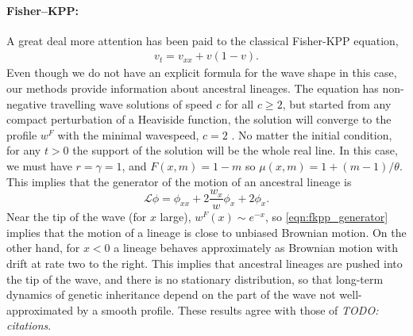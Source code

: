 \documentclass[12pt]{article}
\newcommand{\Lgen}{\mathcal{L}}    %
\newcommand{\comment}[1]{{\color{blue} \it #1}}
\begin{document}
\paragraph{Fisher--KPP:}
A great deal more attention has been paid to the classical Fisher-KPP equation,
\begin{align} \label{eqn:fkpp}
    v_t = v_{xx} + v (1-v) .
\end{align}
Even though we do not have an explicit formula for the wave shape in this case,
our methods provide information about ancestral lineages.
The equation has non-negative travelling wave solutions of speed $c$ for all $c \geq 2$, 
but started from any compact perturbation of a Heaviside function, the 
solution will converge to the profile $w^F$ with the minimal wavespeed, $c=2$
\citep{kolmogorov/petrovsky/piscounov:1937,bramson:1983}.
No matter the initial condition,
for any $t>0$ the support of the 
solution will be the whole real line. 
In this case, we must have $r = \gamma = 1$,
and $F(x, m) = 1 - m$ so $\mu(x, m) = 1 + (m-1)/\theta$.
This implies that
the generator of the motion of an ancestral lineage is
\begin{equation} \label{eqn:fkpp_generator}
    \Lgen \phi
    =
    \phi_{xx} + 2 \frac{w_x}{w} \phi_x + 2 \phi_x .
\end{equation}
Near the tip of the wave (for $x$ large), $w^F(x) \sim e^{-x}$,
so \eqref{eqn:fkpp_generator} implies that
the motion of a lineage is close to unbiased Brownian motion.
On the other hand, for $x < 0$ a lineage behaves approximately as
Brownian motion with drift at rate two to the right.
This implies that
ancestral lineages are pushed into the tip of the wave,
and there is no stationary distribution,
so that long-term dynamics of genetic inheritance
depend on the part of the wave not well-approximated by a smooth profile.
These results agree with those of \comment{TODO: citations}.


\end{document}
